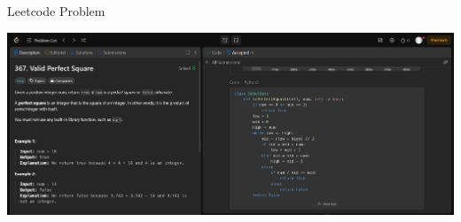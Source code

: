 \documentclass[aspectratio=169,xcolor=dvipsnames]{beamer}
\begin{document}
\begin{frame}{Leetcode Problem}
    \begin{center}
        \includegraphics[scale=0.27]{images/leetcode.png}
    \end{center}
\end{frame}
\end{document}
